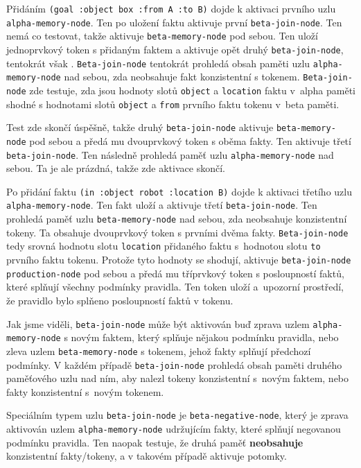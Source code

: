 Přidáním \verb|(goal :object box :from A :to B)| dojde k aktivaci prvního uzlu
\verb|alpha-memory-node|. Ten po uložení faktu aktivuje první
\verb|beta-join-node|. Ten nemá co testovat, takže aktivuje
\verb|beta-memory-node| pod sebou. Ten uloží jednoprvkový token s přidaným
faktem a aktivuje opět druhý \verb|beta-join-node|, tentokrát však .
\verb|Beta-join-node| tentokrát prohledá obsah paměti uzlu \verb|alpha-memory-node|
nad sebou, zda neobsahuje fakt konzistentní s tokenem. \verb|Beta-join-node| zde
testuje, zda jsou hodnoty slotů \verb|object| a \verb|location| faktu v~alpha
paměti shodné s hodnotami slotů \verb|object| a \verb|from| prvního faktu tokenu
v~beta paměti.

Test zde skončí úspěšně, takže druhý \verb|beta-join-node| aktivuje
\verb|beta-memory-node| pod sebou a předá mu dvouprvkový token s oběma fakty.
Ten aktivuje  třetí \verb|beta-join-node|. Ten následně prohledá paměť
uzlu \verb|alpha-memory-node| nad sebou. Ta je ale prázdná, takže zde aktivace
skončí.

Po přidání faktu \verb|(in :object robot :location B)| dojde k aktivaci třetího
uzlu \verb|alpha-memory-node|. Ten fakt uloží a aktivuje  třetí
\verb|beta-join-node|. Ten prohledá paměť uzlu \verb|beta-memory-node| nad sebou, zda
neobsahuje konzistentní tokeny. Ta obsahuje dvouprvkový token s prvními dvěma
fakty. \verb|Beta-join-node| tedy srovná hodnotu slotu \verb|location| přidaného
faktu s~hodnotou slotu \verb|to| prvního faktu tokenu. Protože tyto hodnoty se
shodují, aktivuje \verb|beta-join-node| \verb|production-node| pod sebou a předá
mu tříprvkový token s posloupností faktů, které splňují všechny podmínky
pravidla. Ten token uloží a~upozorní prostředí, že pravidlo bylo splňeno
posloupností faktů v tokenu.

Jak jsme viděli, \verb|beta-join-node| může být aktivován buď zprava uzlem
\verb|alpha-memory-node| s novým faktem, který splňuje nějakou podmínku
pravidla, nebo zleva uzlem \verb|beta-memory-node| s tokenem, jehož fakty splňují
předchozí podmínky. V každém případě \verb|beta-join-node| prohledá obsah paměti
druhého paměťového uzlu nad ním, aby nalezl tokeny konzistentní s~novým faktem,
nebo fakty konzistentní s~novým tokenem.

Speciálním typem uzlu \verb|beta-join-node| je \verb|beta-negative-node|, který je
zprava aktivován uzlem \verb|alpha-memory-node| udržujícím fakty, které splňují
negovanou podmínku pravidla. Ten naopak testuje, že druhá paměť
\textbf{neobsahuje} konzistentní fakty/tokeny, a v takovém případě aktivuje
potomky.

